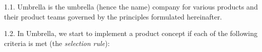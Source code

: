 \documentclass[11pt]{article}
\theoremstyle{remark}
\theoremstyle{definition}
\begin{document}
\begin{comment}
\begin{itemize}
\item кто ваши конкуренты, кто может им стать, кто самый большой, сколько он зарабатывает
\item сколько клиенты тратят денег до того, как начать вами пользоваться?
\item какая у вас будет самая большая проблема через 6 месяцев?

\item способны ли вы создать прорывную технологию, вместо постоянных усовершенствований?
\item начинаете ли вы с большой долей маленького рынка?

\item какова ваша стратегия вывода продукта на рынок?
\item будут ли ваши рыночные позиции прочны через 10 лет?
\item удалось ли вам обнаружить уникальную возможность, которую другие не видят?
\end{itemize}
\end{comment}










\item[1.1.] Umbrella is the umbrella (hence the name) company for various products and their product teams governed by the principles formulated hereinafter. %



\item[1.2.] In Umbrella, we start to implement a product concept if each of the following criteria is met (the \textit{selection rule}):
\end{document}

